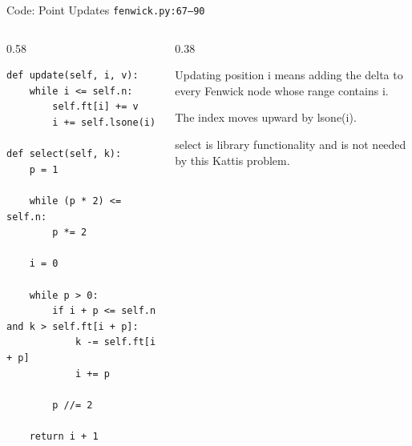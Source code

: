 \documentclass[aspectratio=169,11pt]{beamer}
\begin{document}
\begin{frame}[fragile]{Code: Point Updates}
\scriptsize
{} \texttt{fenwick.py:67--90}

\vspace{0.08cm}
\begin{columns}[T,totalwidth=\textwidth]
\begin{column}{0.58\textwidth}
\begin{lstlisting}[style=cpcode]
def update(self, i, v):
    while i <= self.n:
        self.ft[i] += v
        i += self.lsone(i)

def select(self, k):
    p = 1

    while (p * 2) <= self.n:
        p *= 2

    i = 0

    while p > 0:
        if i + p <= self.n and k > self.ft[i + p]:
            k -= self.ft[i + p]
            i += p

        p //= 2

    return i + 1
\end{lstlisting}
\end{column}
\begin{column}{0.38\textwidth}
\begin{tightitemize}
  \item Updating position i means adding the delta to every Fenwick node whose range contains i.
  \item The index moves upward by lsone(i).
  \item select is library functionality and is not needed by this Kattis problem.
\end{tightitemize}
\end{column}
\end{columns}
\end{frame}
\end{document}
